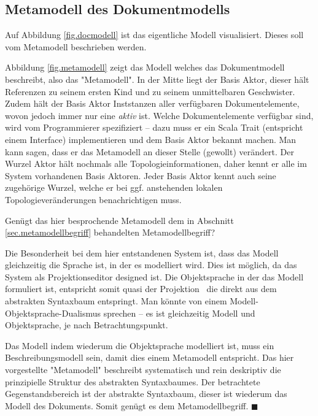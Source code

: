 \subsection{Metamodell des Dokumentmodells}\label{sec.meta}

Auf Abbildung \ref{fig.docmodell} ist das eigentliche Modell visualisiert.
Dieses soll vom Metamodell beschrieben werden.


Abbildung \ref{fig.metamodell} zeigt das Modell welches das Dokumentmodell beschreibt,
also das "Metamodell".
In der Mitte liegt der Basis Aktor, dieser hält Referenzen zu seinem ersten Kind
und zu seinem unmittelbaren Geschwister.
Zudem hält der Basis Aktor Inststanzen aller verfügbaren Dokumentelemente,
wovon jedoch immer nur eine \emph{aktiv} ist.
Welche Dokumentelemente verfügbar sind, wird vom Programmierer spezifiziert -- dazu
muss er ein Scala Trait (entspricht einem Interface) implementieren und dem
Basis Aktor bekannt machen.
Man kann sagen, dass er das Metamodell an dieser Stelle (gewollt) verändert.
Der Wurzel Aktor hält nochmals alle Topologieinformationen, daher kennt er
alle im System vorhandenen Basis Aktoren.
Jeder Basis Aktor kennt auch seine zugehörige Wurzel, welche er bei ggf. anstehenden
lokalen Topologieveränderungen benachrichtigen muss.


Genügt das hier besprochende Metamodell dem in Abschnitt
\ref{sec.metamodellbegriff} behandelten Metamodellbegriff?

Die Besonderheit bei dem hier entstandenen System ist, dass das
Modell gleichzeitig die Sprache ist, in der es modelliert wird.
Dies ist möglich, da das System als Projektionseditor designed ist.
Die Objektsprache in der das Modell formuliert ist,
entspricht somit quasi der Projektion
~die direkt aus dem abstrakten Syntaxbaum entspringt.
Man könnte von einem Modell-Objektsprache-Dualismus sprechen --
es ist gleichzeitig Modell und Objektsprache, je nach Betrachtungspunkt.

Das Modell indem wiederum die Objektsprache modelliert ist, muss ein Beschreibungsmodell sein,
damit dies einem Metamodell entspricht.
Das hier vorgestellte "Metamodell" beschreibt systematisch und rein deskriptiv
die prinzipielle Struktur des abstrakten Syntaxbaumes.
Der betrachtete Gegenstandsbereich ist der abstrakte Syntaxbaum, dieser ist
wiederum das Modell des Dokuments.
Somit genügt es dem Metamodellbegriff. $\blacksquare$


